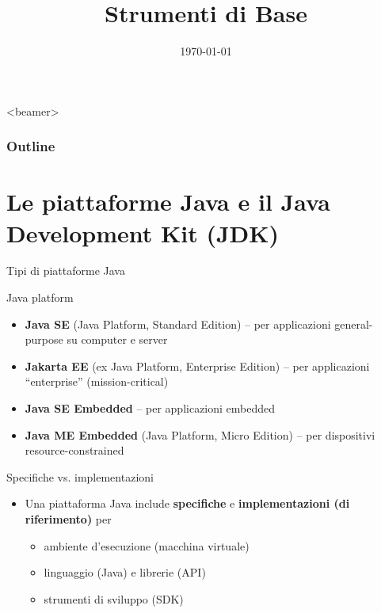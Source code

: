 \documentclass[xcolor=dvipsnames,presentation]{beamer}
\title[{\lab} -- Strumenti di Base]{Strumenti di Base}
\date[\today]{\today}
\begin{document}
\frame[label=coverpage]{\titlepage}

\begin{frame}<beamer>
    \frametitle{Outline}
    \tableofcontents[]
\end{frame}

\section{Le piattaforme Java e il Java Development Kit (JDK)}

\begin{frame}{Tipi di piattaforme Java}

\begin{block}{Java platform}
\begin{itemize}
\item \textbf{Java SE} (Java Platform, Standard Edition) -- per applicazioni general-purpose su computer e server
\item \textbf{Jakarta EE} (ex Java Platform, Enterprise Edition) -- per applicazioni ``enterprise'' (mission-critical)
\item \textbf{Java SE Embedded} -- per applicazioni embedded
\item \textbf{Java ME Embedded} (Java Platform, Micro Edition) -- per dispositivi resource-constrained
\end{itemize}
\end{block}

\begin{block}{Specifiche vs. implementazioni}
\begin{itemize}
\item Una piattaforma Java include \textbf{specifiche} e \textbf{implementazioni (di riferimento)} per
	\begin{itemize}
	\item ambiente d'esecuzione (macchina virtuale)
	\item linguaggio (Java) e librerie (API)
	\item strumenti di sviluppo (SDK)
	\end{itemize}
\end{itemize}
\end{block}

\end{frame}
\end{document}
